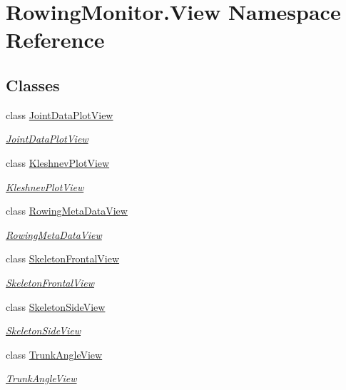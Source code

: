 \hypertarget{namespace_rowing_monitor_1_1_view}{}\section{Rowing\+Monitor.\+View Namespace Reference}
\label{namespace_rowing_monitor_1_1_view}
\subsection*{Classes}
\begin{DoxyCompactItemize}
\item 
class \hyperlink{class_rowing_monitor_1_1_view_1_1_joint_data_plot_view}{Joint\+Data\+Plot\+View}
\begin{DoxyCompactList}\small\item\em \hyperlink{class_rowing_monitor_1_1_view_1_1_joint_data_plot_view}{Joint\+Data\+Plot\+View} \end{DoxyCompactList}\item 
class \hyperlink{class_rowing_monitor_1_1_view_1_1_kleshnev_plot_view}{Kleshnev\+Plot\+View}
\begin{DoxyCompactList}\small\item\em \hyperlink{class_rowing_monitor_1_1_view_1_1_kleshnev_plot_view}{Kleshnev\+Plot\+View} \end{DoxyCompactList}\item 
class \hyperlink{class_rowing_monitor_1_1_view_1_1_rowing_meta_data_view}{Rowing\+Meta\+Data\+View}
\begin{DoxyCompactList}\small\item\em \hyperlink{class_rowing_monitor_1_1_view_1_1_rowing_meta_data_view}{Rowing\+Meta\+Data\+View} \end{DoxyCompactList}\item 
class \hyperlink{class_rowing_monitor_1_1_view_1_1_skeleton_frontal_view}{Skeleton\+Frontal\+View}
\begin{DoxyCompactList}\small\item\em \hyperlink{class_rowing_monitor_1_1_view_1_1_skeleton_frontal_view}{Skeleton\+Frontal\+View} \end{DoxyCompactList}\item 
class \hyperlink{class_rowing_monitor_1_1_view_1_1_skeleton_side_view}{Skeleton\+Side\+View}
\begin{DoxyCompactList}\small\item\em \hyperlink{class_rowing_monitor_1_1_view_1_1_skeleton_side_view}{Skeleton\+Side\+View} \end{DoxyCompactList}\item 
class \hyperlink{class_rowing_monitor_1_1_view_1_1_trunk_angle_view}{Trunk\+Angle\+View}
\begin{DoxyCompactList}\small\item\em \hyperlink{class_rowing_monitor_1_1_view_1_1_trunk_angle_view}{Trunk\+Angle\+View} \end{DoxyCompactList}\end{DoxyCompactItemize}
